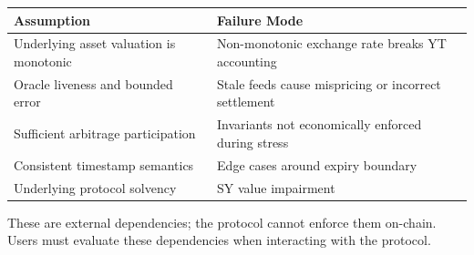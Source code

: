 \begin{center}
\begin{tabularx}{\textwidth}{>{\raggedright\arraybackslash}X >{\raggedright\arraybackslash}X}
\toprule
\textbf{Assumption} & \textbf{Failure Mode} \\
\midrule
Underlying asset valuation is monotonic & Non-monotonic exchange rate breaks YT accounting \\
Oracle liveness and bounded error & Stale feeds cause mispricing or incorrect settlement \\
Sufficient arbitrage participation & Invariants not economically enforced during stress \\
Consistent timestamp semantics & Edge cases around expiry boundary \\
Underlying protocol solvency & SY value impairment \\
\bottomrule
\end{tabularx}
\end{center}

These are external dependencies; the protocol cannot enforce them on-chain. Users must evaluate these dependencies when interacting with the protocol.
